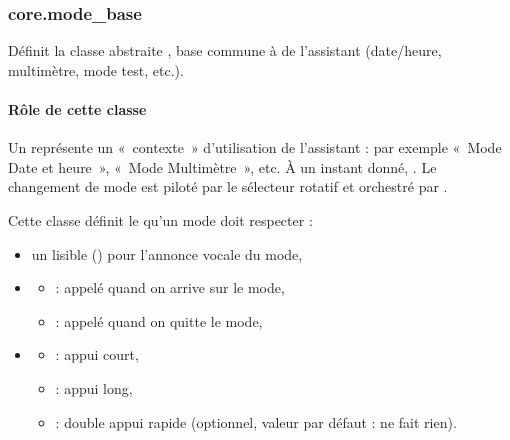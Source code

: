 \documentclass[letterpaper,10pt,french]{sphinxmanual}
\begin{document}
\subsubsection{core.mode\_base}
\label{\detokenize{api/core:core-mode-base}}
\sphinxAtStartPar
Définit la classe abstraite , base commune à  de l’assistant (date/heure, multimètre, mode test, etc.).


\paragraph{Rôle de cette classe}
\label{\detokenize{api/core:role-de-cette-classe}}
\sphinxAtStartPar
Un  représente un « contexte » d’utilisation de l’assistant :
par exemple « Mode Date et heure », « Mode Multimètre », etc.
À un instant donné, . Le changement de mode
est piloté par le sélecteur rotatif et orchestré par .

\sphinxAtStartPar
Cette classe définit le  qu’un mode doit respecter :
\begin{itemize}
\item {} 
\sphinxAtStartPar
un  lisible () pour l’annonce vocale du mode,

\item {} \begin{description}
\begin{itemize}
\item {} 
\sphinxAtStartPar
{} : appelé quand on arrive sur le mode,

\item {} 
\sphinxAtStartPar
{} : appelé quand on quitte le mode,

\end{itemize}

\end{description}

\item {} \begin{description}
\begin{itemize}
\item {} 
\sphinxAtStartPar
{} : appui court,

\item {} 
\sphinxAtStartPar
{}  : appui long,

\item {} 
\sphinxAtStartPar
{} : double appui rapide (optionnel, valeur par défaut : ne fait rien).

\end{itemize}

\end{description}

\end{itemize}
\end{document}
